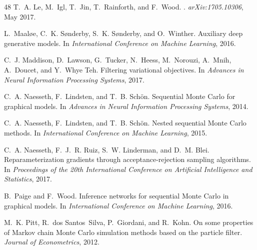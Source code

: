 \begin{thebibliography}{48}
T.~A. {Le}, M.~{Igl}, T.~{Jin}, T.~{Rainforth}, and F.~{Wood}.
.
\newblock \emph{arXiv:1705.10306}, May 2017.

L.~Maal{\o}e, C.~K. S{\o}nderby, S.~K. S{\o}nderby, and O.~Winther.
\newblock Auxiliary deep generative models.
\newblock In \emph{International Conference on Machine Learning}, 2016.

C.~J. {Maddison}, D.~{Lawson}, G.~{Tucker}, N.~{Heess}, M.~{Norouzi},
  A.~{Mnih}, A.~{Doucet}, and Y.~{Whye Teh}.
\newblock Filtering variational objectives.
\newblock In \emph{Advances in Neural Information Processing Systems}, 2017.

C.~A. Naesseth, F.~Lindsten, and T.~B. Sch\"{o}n.
\newblock Sequential {Monte} {Carlo} for graphical models.
\newblock In \emph{Advances in Neural Information Processing Systems}, 2014.

C.~A. Naesseth, F.~Lindsten, and T.~B. Sch\"{o}n.
\newblock Nested sequential {M}onte {C}arlo methods.
\newblock In \emph{International Conference on Machine Learning}, 2015.

C.~A. Naesseth, F.~J.~R. Ruiz, S.~W. Linderman, and D.~M. Blei.
\newblock Reparameterization gradients through acceptance-rejection sampling
  algorithms.
\newblock In \emph{Proceedings of the 20th International Conference on
  Artificial Intelligence and Statistics}, 2017.

B.~Paige and F.~Wood.
\newblock Inference networks for sequential {M}onte {C}arlo in graphical
  models.
\newblock In \emph{International Conference on Machine Learning}, 2016.

M.~K. Pitt, R.~dos Santos~Silva, P.~Giordani, and R.~Kohn.
\newblock On some properties of {M}arkov chain {M}onte {C}arlo simulation
  methods based on the particle filter.
\newblock \emph{Journal of Econometrics}, 2012.


\end{thebibliography}
